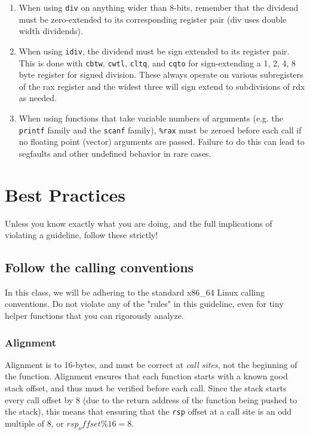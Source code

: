 \documentclass[11pt]{article}
\begin{document}
\begin{enumerate}
    \item When using \texttt{div} on anything wider than 8-bits, remember that the
        dividend must be zero-extended to its corresponding register pair (div uses
        double width dividends).

    \item When using \texttt{idiv}, the dividend must be sign extended to its register
        pair. This is done with \texttt{cbtw}, \texttt{cwtl}, \texttt{cltq}, and
        \texttt{cqto} for sign-extending a 1, 2, 4, 8 byte register for signed division.
        These always operate on various subregisters of the rax register and the widest
        three will sign extend to subdivisions of rdx as needed.

    \item When using functions that take variable numbers of arguments (e.g. the
        \texttt{printf} family and the \texttt{scanf} family), \texttt{\%rax} must be
        zeroed before each call if no floating point (vector) arguments are passed.
        Failure to do this can lead to segfaults and other undefined behavior in rare
        cases.
\end{enumerate}


\section{Best Practices}

Unless you know exactly what you are doing, and the full implications of violating a
guideline, follow these strictly!

\subsection{Follow the calling conventions}

In this class, we will be adhering to the standard x86\_64 Linux calling conventions. Do
not violate any of the "rules" in this guideline, even for tiny helper functions that you
can rigorously analyze.

\subsubsection{Alignment} Alignment is to 16-bytes, and must be correct at \emph{call
sites}, not the beginning of the function. Alignment ensures that each function starts
with a known good stack offset, and thus must be verified before each call. Since the
stack starts every call offset by 8 (due to the return address of the function being
pushed to the stack), this means that ensuring that the \texttt{rsp} offset at a call site
is an odd multiple of 8, or $rsp_offset \% 16 = 8$.
\end{document}
